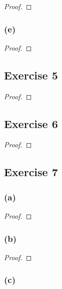 \documentclass[14pt]{extarticle}
\begin{document}
\begin{proof}

\end{proof}

\subsubsection{(e)}

\begin{proof}

\end{proof}

\subsection{Exercise 5}

\begin{proof}

\end{proof}

\subsection{Exercise 6}

\begin{proof}

\end{proof}

\subsection{Exercise 7}

\subsubsection{(a)}

\begin{proof}

\end{proof}

\subsubsection{(b)}

\begin{proof}

\end{proof}

\subsubsection{(c)}
\end{document}
